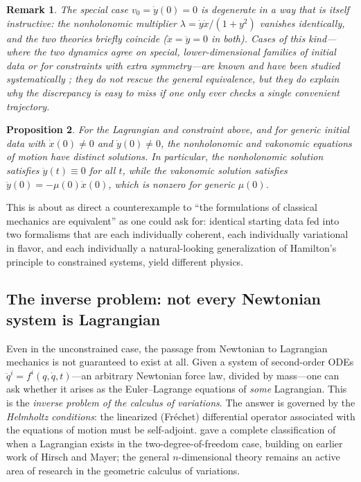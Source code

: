 \documentclass[11pt]{article}
\newtheorem{proposition}{Proposition}[section]
\newtheorem{remark}[proposition]{Remark}
\begin{document}
\begin{remark}
The special case $v_0 = \dot y(0) = 0$ is degenerate in a way that is itself instructive: the nonholonomic multiplier $\lambda = \dot y\dot x/(1+y^2)$ vanishes identically, and the two theories briefly coincide ($\ddot x=\ddot y=0$ in both). Cases of this kind---where the two dynamics agree on special, lower-dimensional families of initial data or for constraints with extra symmetry---are known and have been studied systematically \citep{akn2006}; they do not rescue the general equivalence, but they do explain why the discrepancy is easy to miss if one only ever checks a single convenient trajectory.
\end{remark}

\begin{proposition}
\label{prop:nonequiv}
For the Lagrangian and constraint above, and for generic initial data with $\dot x(0)\neq 0$ and $\dot y(0)\neq 0$, the nonholonomic and vakonomic equations of motion have distinct solutions. In particular, the nonholonomic solution satisfies $\ddot y(t) \equiv 0$ for all $t$, while the vakonomic solution satisfies $\ddot y(0) = -\mu(0)\dot x(0)$, which is nonzero for generic $\mu(0)$.
\end{proposition}

This is about as direct a counterexample to ``the formulations of classical mechanics are equivalent'' as one could ask for: identical starting data fed into two formalisms that are each individually coherent, each individually variational in flavor, and each individually a natural-looking generalization of Hamilton's principle to constrained systems, yield different physics.

\subsection{The inverse problem: not every Newtonian system is Lagrangian}
\label{sec:helmholtz}

Even in the unconstrained case, the passage from Newtonian to Lagrangian mechanics is not guaranteed to exist at all. Given a system of second-order ODEs $\ddot q^i = f^i(q,\dot q,t)$---an arbitrary Newtonian force law, divided by mass---one can ask whether it arises as the Euler--Lagrange equations of \emph{some} Lagrangian. This is the \emph{inverse problem of the calculus of variations}. The answer is governed by the \emph{Helmholtz conditions}: the linearized (Fr\'echet) differential operator associated with the equations of motion must be self-adjoint. \citet{douglas1941} gave a complete classification of when a Lagrangian exists in the two-degree-of-freedom case, building on earlier work of Hirsch and Mayer; the general $n$-dimensional theory remains an active area of research in the geometric calculus of variations.
\end{document}
